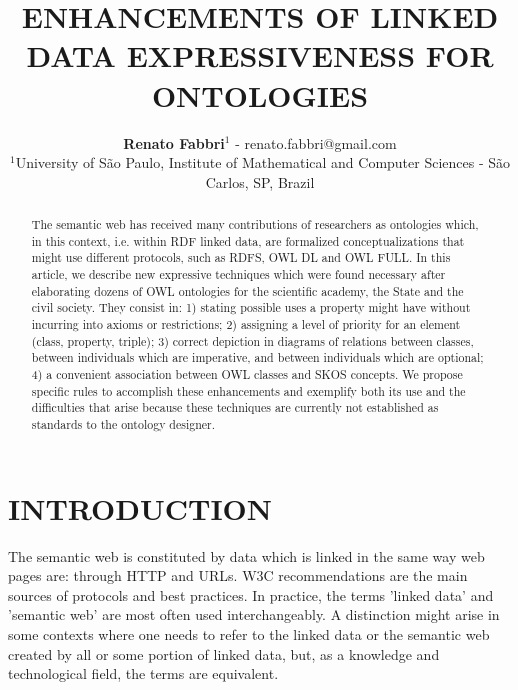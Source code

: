 \documentclass[12pt,fleqn]{article}
\title{ENHANCEMENTS OF LINKED DATA EXPRESSIVENESS FOR ONTOLOGIES}
\author
    {\rm \begin{tabular}{l} 
    \textbf{Renato Fabbri}$^{1}$ - {\textnormal renato.fabbri@gmail.com}\\%
    {\fontsize{11}{0}\selectfont $^{1}$University of São Paulo, Institute of Mathematical and Computer Sciences - São Carlos, SP, Brazil}\vspace*{-0.05cm} \\
  \end{tabular}}
\renewcommand{\headrulewidth}{0.0pt}
\begin{document}
\maketitle

\thispagestyle{firspagetstyle}

\renewcommand{\headrulewidth}{0.0pt}
\rhead{}

\begin{abstract}
The semantic web has received many contributions of researchers as ontologies which,
in this context, i.e. within RDF linked data, are formalized conceptualizations that might use
different protocols, such as RDFS, OWL DL and OWL FULL.
In this article, we describe new expressive techniques which were found necessary after
elaborating dozens of OWL ontologies for the scientific academy, the State and the civil society.
They consist in: 1) stating possible uses a property might have without incurring into axioms or restrictions;
2) assigning a level of priority for an element (class, property, triple); 3) correct depiction in diagrams
of relations between classes, between individuals which are imperative, and between individuals which are optional;
4) a convenient association between OWL classes and SKOS concepts.
We propose specific rules to accomplish these enhancements and exemplify both its use
and the difficulties that arise because these techniques are currently not established as standards to the ontology designer.  
\end{abstract}


\pagestyle{fancy}

\section{INTRODUCTION}
The semantic web is constituted by data which is linked in the same way
web pages are: through HTTP and URLs.
W3C recommendations are the main sources of protocols and best practices.
In practice, the terms 'linked data' and 'semantic web' are most often used interchangeably.
A distinction might arise in some contexts where one needs to refer to the linked data or
the semantic web created by all or some portion of linked data, but, as a knowledge and technological
field, the terms are equivalent.
\end{document}
